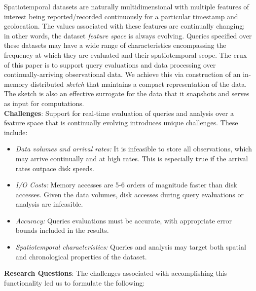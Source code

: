 Spatiotemporal datasets are naturally multidimensional with multiple features of interest being reported/recorded continuously for a particular timestamp and geolocation. The values associated with these features are continually changing; in other words, the dataset \emph{feature space} is always evolving.  Queries specified over these datasets may have a wide range of characteristics encompassing the frequency at which they are evaluated and their spatiotemporal scope. The crux of this paper is to support query evaluations and data processing over continually-arriving observational data. We achieve this via construction of an in-memory distributed \emph{sketch} that maintains a compact representation of the data.
The sketch is also an effective surrogate for the data that it snapshots and serves as input for computations.
%
%
\vspace{0.7em}\\
%
\textbf{Challenges}:
Support for real-time evaluation of queries and analysis over a feature space that is continually evolving introduces unique challenges. These include:
\begin{itemize}[leftmargin=*]
    \item   \emph{Data volumes and arrival rates:} It is infeasible to store all observations, which may arrive continually and at high rates. This is especially true if the arrival rates outpace disk speeds.
    \item \emph{I/O Costs:} Memory accesses are 5-6 orders of magnitude faster than disk accesses. Given the data volumes, disk accesses during query evaluations or analysis are infeasible.
    \item   \emph{Accuracy:} Queries evaluations must be accurate, with appropriate error bounds included in the results.
    \item   \emph{Spatiotemporal characteristics:} Queries and analysis may target both spatial and chronological properties of the dataset.
\end{itemize}
%
\vspace{0.7em}
%
\textbf{Research Questions}:
The challenges associated with accomplishing this functionality led us to formulate the following:

